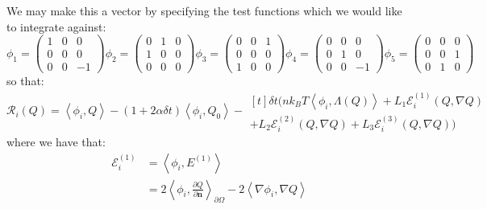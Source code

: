 \documentclass[reqno]{article}
\begin{document}
We may make this a vector by specifying the test functions which we would like to integrate against:
\begin{equation}
    \phi_1
    =
    \begin{pmatrix}
        1 & 0 & 0 \\
        0 & 0 & 0 \\
        0 & 0 & -1
    \end{pmatrix}
    \phi_2
    =
    \begin{pmatrix}
        0 & 1 & 0 \\
        1 & 0 & 0 \\
        0 & 0 & 0
    \end{pmatrix}
    \phi_3
    =
    \begin{pmatrix}
        0 & 0 & 1 \\
        0 & 0 & 0 \\
        1 & 0 & 0
    \end{pmatrix}
    \phi_4
    =
    \begin{pmatrix}
        0 & 0 & 0 \\
        0 & 1 & 0 \\
        0 & 0 & -1
    \end{pmatrix}
    \phi_5
    =
    \begin{pmatrix}
        0 & 0 & 0 \\
        0 & 0 & 1 \\
        0 & 1 & 0
    \end{pmatrix}
\end{equation}
so that:
\begin{equation}
    \mathcal{R}_i(Q)
    =
    \left<\phi_i, Q\right> 
    - \left(1 + 2 \alpha \delta t \right) \left<\phi_i, Q_0\right>
    - 
    \begin{multlined}[t]
    \delta t \bigl(
    n k_B T \left<\phi_i, \Lambda(Q) \right>
        + L_1 \mathcal{E}^{(1)}_i (Q, \nabla Q) \\
        + L_2 \mathcal{E}^{(2)}_i (Q, \nabla Q)
        + L_3 \mathcal{E}^{(3)}_i (Q, \nabla Q)
    \bigr)
    \end{multlined}
\end{equation}
where we have that:
\begin{equation}
    \begin{split}
        \mathcal{E}^{(1)}_i
        &=
        \left< \phi_i, E^{(1)} \right> \\
        &=
        2 \left< \phi_i, \frac{\partial Q}{\partial \mathbf{n}}\right>_{\partial \Omega}
        - 2 \left< \nabla \phi_i, \nabla Q \right>
    \end{split}
\end{equation}
\end{document}
